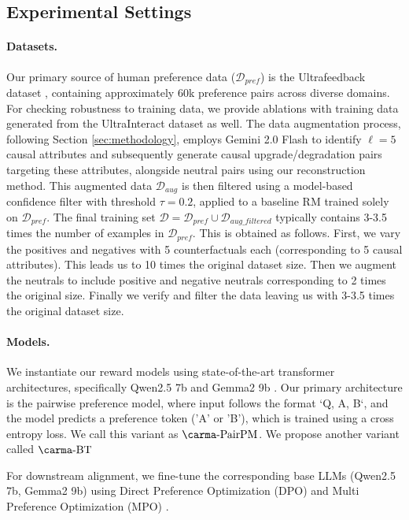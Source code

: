 \subsection{Experimental Settings}
\label{subsec:experimental_settings}

\paragraph{Datasets.}
Our primary source of human preference data ($\mathcal{D}_{pref}$) is the Ultrafeedback dataset \cite{cui2023ultrafeedback}, containing approximately 60k preference pairs across diverse domains. For checking robustness to training data, we provide ablations with training data generated from the UltraInteract dataset \cite{yuan2024advancing} as well. The data augmentation process, following Section \ref{sec:methodology}, employs Gemini 2.0 Flash to identify $\ell=5$ causal attributes and subsequently generate causal upgrade/degradation pairs targeting these attributes, alongside neutral pairs using our reconstruction method. This augmented data $\mathcal{D}_{aug}$ is then filtered using a model-based confidence filter with threshold $\tau=0.2$, applied to a baseline RM trained solely on $\mathcal{D}_{pref}$. The final training set $\mathcal{D} = \mathcal{D}_{pref} \cup \mathcal{D}_{aug\_filtered}$ typically contains 3-3.5 times the number of examples in $\mathcal{D}_{pref}$. This is obtained as follows. First, we vary the positives and negatives with 5 counterfactuals each (corresponding to 5 causal attributes). This leads us to 10 times the original dataset size. Then we augment the neutrals to include positive and negative neutrals corresponding to 2 times the original size. Finally we verify and filter the data leaving us with 3-3.5 times the original dataset size.

\paragraph{Models.}
We instantiate our reward models using state-of-the-art transformer architectures, specifically Qwen2.5 7b \cite{yang2024qwen2} and Gemma2 9b \cite{team2024gemma}. Our primary architecture is the pairwise preference model, where input follows the format `Q, A, B`, and the model predicts a preference token ('A' or 'B'), which is trained using a cross entropy loss. We call this variant as $\carma\text{-PairPM}$. We propose another variant called $\carma \text{-BT}$

For downstream alignment, we fine-tune the corresponding base LLMs (Qwen2.5 7b, Gemma2 9b) using Direct Preference Optimization (DPO) \cite{rafailov2024direct} and Multi Preference Optimization (MPO) \cite{gupta2024swepo}.

